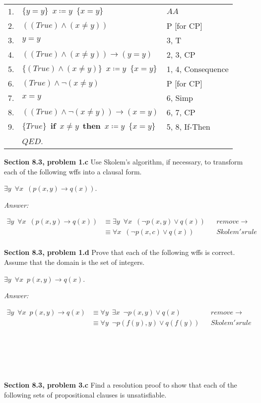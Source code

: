 \documentclass[12pt]{article}
\begin{document}
\begin{tabular}{p{.8cm}p{8.5cm}l}
1. & $\{ y = y \} \enspace x \coloneqq y \enspace \{ x = y \}$   & $AA$ \\
2. & \qquad $((True) \land (x \neq y))$ & P [for CP]\\
3. & \qquad $y = y$ & 3, T \\
4. & $((True) \land (x \neq y)) \rightarrow (y = y)$  & 2, 3, CP \\
5. & $\{ (True) \land (x \neq y)\} \enspace x \coloneqq y \enspace \{ x = y \}$ 
                                                            & 1, 4, Consequence \\
6. & \qquad $(True) \land \neg (x \neq y)$ & P [for CP] \\
7. & \qquad $x = y$ & 6, Simp \\
8. & $((True) \land \neg (x \neq y)) \rightarrow (x = y)$ & 6, 7, CP \\
9. & $\{ True \} \enspace \textbf{if} \enspace x \neq y \enspace \textbf{then} \enspace 
x \coloneqq y \enspace \{ x = y \}$ & 5, 8, If-Then\\
& $QED$. \\
\end{tabular}

\textbf{Section 8.3, problem 1.c}  Use Skolem’s algorithm, if necessary, to  
transform each of the following wffs into a clausal form.

$\exists y \enspace \forall x \enspace (p(x, y) \rightarrow q(x))$.

\emph{Answer:} 

\begin{align*}
\exists y \enspace \forall x \enspace (p(x, y) \rightarrow q(x))
    & \equiv \exists y \enspace \forall x \enspace (\neg p(x, y) \lor q(x)) 
    && remove \rightarrow \\
    &  \equiv \forall x \enspace (\neg p(x,c) \lor q(x))  
    && Skolem's rule \\
\end{align*}

\textbf{Section 8.3, problem 1.d}  Prove that each of the following wffs is correct. 
Assume that the domain is the set of integers.

$\exists y \enspace \forall x \enspace p(x, y) \rightarrow q(x)$.

\emph{Answer:} 

\begin{align*}
\exists y \enspace \forall x \enspace p(x, y) \rightarrow q(x)
    & \equiv \forall y \enspace \exists x \enspace \neg p(x, y) \lor q(x) 
    && remove \rightarrow \\
    &  \equiv \forall y \enspace \neg p(f(y),y) \lor q(f(y))  
    && Skolem's rule \\
\end{align*}
\\
\\
\\
\\
\\
\textbf{Section 8.3, problem 3.c}   Find a resolution proof to show that each of the 
following sets of propositional clauses is unsatisfiable.
\end{document}
